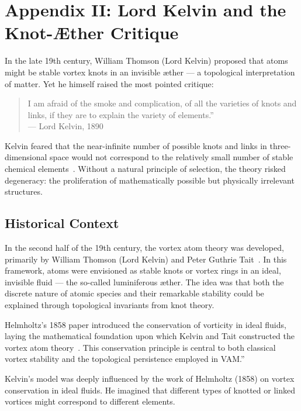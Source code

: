 
\section*{Appendix II: Lord Kelvin and the Knot-Æther Critique}

In the late 19th century, William Thomson (Lord Kelvin) proposed that atoms might be stable vortex knots in an invisible æther — a topological interpretation of matter. Yet he himself raised the most pointed critique:

\begin{quote}
\grqq I am afraid of the smoke and complication, of all the varieties of knots and links, if they are to explain the variety of elements.\textquotedblright \\
— Lord Kelvin, 1890
\end{quote}

Kelvin feared that the near-infinite number of possible knots and links in three-dimensional space would not correspond to the relatively small number of stable chemical elements~\cite{thomson1890knots,tait1877knots}. Without a natural principle of selection, the theory risked degeneracy: the proliferation of mathematically possible but physically irrelevant structures.

\subsection*{Historical Context}

In the second half of the 19th century, the vortex atom theory was developed, primarily by William Thomson (Lord Kelvin) and Peter Guthrie Tait~\cite{thomson1890knots,tait1877knots}. In this framework, atoms were envisioned as stable knots or vortex rings in an ideal, invisible fluid — the so-called luminiferous æther. The idea was that both the discrete nature of atomic species and their remarkable stability could be explained through topological invariants from knot theory.

\grqq Helmholtz's 1858 paper introduced the conservation of vorticity in ideal fluids, laying the mathematical foundation upon which Kelvin and Tait constructed the vortex atom theory~\cite{helmholtz1858vortices}. This conservation principle is central to both classical vortex stability and the topological persistence employed in VAM.\textquotedblright

Kelvin's model was deeply influenced by the work of Helmholtz (1858) on vortex conservation in ideal fluids. He imagined that different types of knotted or linked vortices might correspond to different elements.

